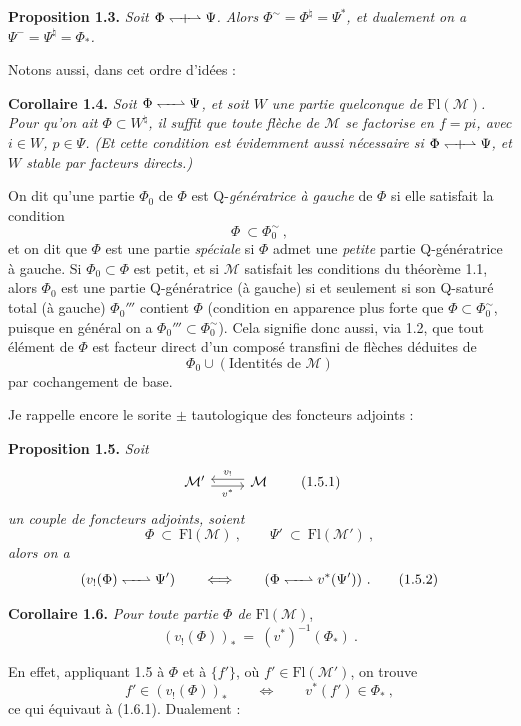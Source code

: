 \textbf{Proposition 1.3.} \textit{Soit $\Phi \mathrel{\leftharpoondown\mkern-9mu{+}\mkern-9mu\rightharpoonup} \Psi$. Alors $\Phi^{\sim} = \Phi^{\natural} = \Psi^{*}$, et dualement on a $\Psi^{-} = \Psi^{\natural} = \Phi_{*}$.}

Notons aussi, dans cet ordre d'idées :

\textbf{Corollaire 1.4.} \textit{Soit $\Phi \Qorth \Psi$, et soit $W$ une partie quelconque de $\mathrm{Fl}(\mathcal{M})$. Pour qu'on ait $\Phi \subset W^{\natural}$, il suffit que toute flèche de $\mathcal{M}$ se factorise en $f = pi$, avec $i \in W$, $p \in \Psi$. (Et cette condition est évidemment aussi nécessaire si $\Phi \mathrel{\leftharpoondown\mkern-9mu{+}\mkern-9mu\rightharpoonup} \Psi$, et $W$ stable par facteurs directs.)}

On dit qu'une partie $\Phi_0$ de $\Phi$ est Q-\textit{génératrice à gauche} de $\Phi$ si elle satisfait la condition
\[
\Phi \ \subset \Phi_0^{\sim}\ , \tag*{(1.9)}
\]
et on dit que $\Phi$ est une partie \textit{spéciale} si $\Phi$ admet une \textit{petite} partie Q-génératrice à gauche. Si $\Phi_0 \subset \Phi$ est petit, et si $\mathcal{M}$ satisfait les conditions du théorème 1.1, alors $\Phi_0$ est une partie Q-génératrice (à gauche) si et seulement si son Q-saturé total (à gauche) $\Phi_0'''$ contient $\Phi$ (condition en apparence plus forte que $\Phi \subset \Phi_0^{\sim}$, puisque en général on a $\Phi_0''' \subset \Phi_0^{\sim}$). Cela signifie donc aussi, via 1.2, que tout  élément de $\Phi$ est facteur direct d'un composé transfini de flèches déduites de
\[
\Phi_0 \cup (\text{Identités de } \mathcal{M})
\]
par cochangement de base.

Je rappelle encore le sorite $\pm$ tautologique des foncteurs adjoints :

\textbf{Proposition 1.5.} \textit{Soit}
\[
\begin{tikzcd}
\mathcal{M}' \arrow[r, shift right=1, "v^{*}"'] & \mathcal{M} \arrow[l, shift right=1, "v_{!}"']
\end{tikzcd}
\tag*{(1.5.1)}
\]
\textit{un couple de foncteurs adjoints, soient}
\[
\Phi \ \subset\ \mathrm{Fl}(\mathcal{M})\ , \qquad \Psi' \ \subset\ \mathrm{Fl}(\mathcal{M}')\ ,
\]
\textit{alors on a}
\[
(v_{!}(\Phi) \Qorth \Psi') \qquad \Longleftrightarrow \qquad (\Phi \Qorth v^{*}(\Psi'))\ . \tag*{(1.5.2)}
\]

\textbf{Corollaire 1.6.} \textit{Pour toute partie $\Phi$ de} $\mathrm{Fl}(\mathcal{M})$,
\[
(v_{!}(\Phi))_{*} \ =\ (v^{*})^{-1}(\Phi_{*})\ . \tag*{(1.6.1)}
\]


En effet, appliquant 1.5 à $\Phi$ et à $\{f'\}$, où $f' \in \mathrm{Fl}(\mathcal{M}')$, on trouve
\[
f' \in (v_{!}(\Phi))_{*} \qquad \Longleftrightarrow \qquad v^{*}(f') \in \Phi_{*}\ ,
\]
ce qui équivaut à (1.6.1). Dualement :


